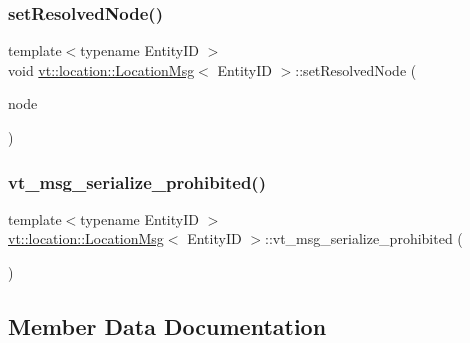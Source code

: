 \subsubsection{\texorpdfstring{set\+Resolved\+Node()}{setResolvedNode()}}
{\footnotesize\ttfamily template$<$typename Entity\+ID $>$ \\
void \hyperlink{structvt_1_1location_1_1_location_msg}{vt\+::location\+::\+Location\+Msg}$<$ Entity\+ID $>$\+::set\+Resolved\+Node (\begin{DoxyParamCaption}\item[{\hyperlink{namespacevt_a866da9d0efc19c0a1ce79e9e492f47e2}{Node\+Type} const \&}]{node }\end{DoxyParamCaption})\hspace{0.3cm}{\ttfamily [inline]}}

\mbox{\label{structvt_1_1location_1_1_location_msg_a772844def532d4cbe03f197d621d501e}} 
\subsubsection{\texorpdfstring{vt\+\_\+msg\+\_\+serialize\+\_\+prohibited()}{vt\_msg\_serialize\_prohibited()}}
{\footnotesize\ttfamily template$<$typename Entity\+ID $>$ \\
\hyperlink{structvt_1_1location_1_1_location_msg}{vt\+::location\+::\+Location\+Msg}$<$ Entity\+ID $>$\+::vt\+\_\+msg\+\_\+serialize\+\_\+prohibited (\begin{DoxyParamCaption}{ }\end{DoxyParamCaption})}



\subsection{Member Data Documentation}
\mbox{\label{structvt_1_1location_1_1_location_msg_ab99a70172011e251d4abec4f2110fc08}} 
